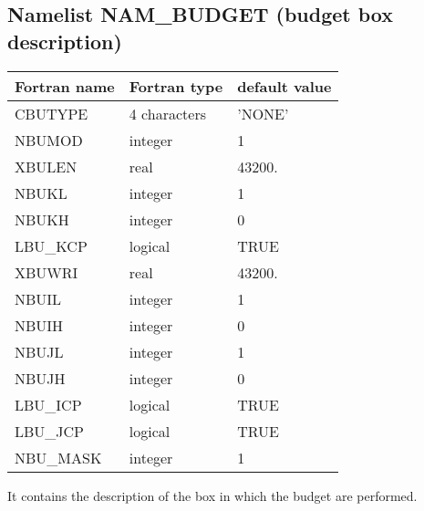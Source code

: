 \subsection{Namelist NAM\_BUDGET (budget box description)}
\label{ss:budget}

\begin{longtable} {|p{}|p{}|p{}|}
\hline
Fortran name &  Fortran type & default value \\
\hline 
\endhead
\hline
\endfoot
CBUTYPE   &  4 characters   & 'NONE'     \\
NBUMOD    & integer & 1        \\
XBULEN    & real    & 43200.   \\
NBUKL     & integer & 1        \\
NBUKH     & integer & 0        \\
LBU\_KCP  & logical & TRUE     \\
XBUWRI    & real    & 43200.   \\
NBUIL     & integer & 1        \\
NBUIH     & integer & 0        \\
NBUJL     & integer & 1        \\
NBUJH     & integer & 0        \\
LBU\_ICP  & logical & TRUE     \\
LBU\_JCP  & logical & TRUE     \\
NBU\_MASK & integer & 1 \\
\end{longtable}

It contains the description of the box in which the budget are performed. 


